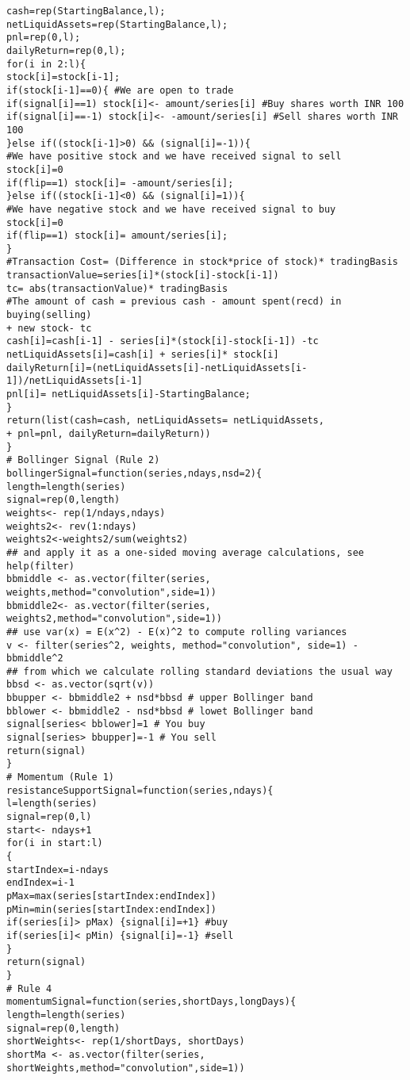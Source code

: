 \begin{small}
\begin{lstlisting}
cash=rep(StartingBalance,l);
netLiquidAssets=rep(StartingBalance,l);
pnl=rep(0,l);
dailyReturn=rep(0,l);
for(i in 2:l){
stock[i]=stock[i-1];
if(stock[i-1]==0){ #We are open to trade
if(signal[i]==1) stock[i]<- amount/series[i] #Buy shares worth INR 100
if(signal[i]==-1) stock[i]<- -amount/series[i] #Sell shares worth INR 100
}else if((stock[i-1]>0) && (signal[i]=-1)){
#We have positive stock and we have received signal to sell
stock[i]=0
if(flip==1) stock[i]= -amount/series[i];
}else if((stock[i-1]<0) && (signal[i]=1)){
#We have negative stock and we have received signal to buy
stock[i]=0
if(flip==1) stock[i]= amount/series[i];
}
#Transaction Cost= (Difference in stock*price of stock)* tradingBasis
transactionValue=series[i]*(stock[i]-stock[i-1])
tc= abs(transactionValue)* tradingBasis
#The amount of cash = previous cash - amount spent(recd) in buying(selling) 
+ new stock- tc
cash[i]=cash[i-1] - series[i]*(stock[i]-stock[i-1]) -tc
netLiquidAssets[i]=cash[i] + series[i]* stock[i]
dailyReturn[i]=(netLiquidAssets[i]-netLiquidAssets[i-1])/netLiquidAssets[i-1]
pnl[i]= netLiquidAssets[i]-StartingBalance;
}
return(list(cash=cash, netLiquidAssets= netLiquidAssets,
+ pnl=pnl, dailyReturn=dailyReturn))
}
# Bollinger Signal (Rule 2)
bollingerSignal=function(series,ndays,nsd=2){
length=length(series)
signal=rep(0,length)
weights<- rep(1/ndays,ndays)
weights2<- rev(1:ndays)
weights2<-weights2/sum(weights2)
## and apply it as a one-sided moving average calculations, see help(filter)
bbmiddle <- as.vector(filter(series, weights,method="convolution",side=1))
bbmiddle2<- as.vector(filter(series, weights2,method="convolution",side=1))
## use var(x) = E(x^2) - E(x)^2 to compute rolling variances
v <- filter(series^2, weights, method="convolution", side=1) - bbmiddle^2
## from which we calculate rolling standard deviations the usual way
bbsd <- as.vector(sqrt(v))
bbupper <- bbmiddle2 + nsd*bbsd # upper Bollinger band
bblower <- bbmiddle2 - nsd*bbsd # lowet Bollinger band
signal[series< bblower]=1 # You buy
signal[series> bbupper]=-1 # You sell
return(signal)
}
# Momentum (Rule 1)
resistanceSupportSignal=function(series,ndays){
l=length(series)
signal=rep(0,l)
start<- ndays+1
for(i in start:l)
{
startIndex=i-ndays
endIndex=i-1
pMax=max(series[startIndex:endIndex])
pMin=min(series[startIndex:endIndex])
if(series[i]> pMax) {signal[i]=+1} #buy
if(series[i]< pMin) {signal[i]=-1} #sell
}
return(signal)
}
# Rule 4
momentumSignal=function(series,shortDays,longDays){
length=length(series)
signal=rep(0,length)
shortWeights<- rep(1/shortDays, shortDays)
shortMa <- as.vector(filter(series, shortWeights,method="convolution",side=1))

\end{lstlisting}
\end{small}
